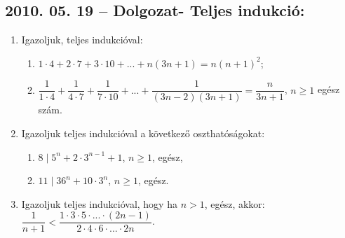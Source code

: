 \documentclass{article}
\newenvironment{abc}{\begin{enumerate}[label=\textit{\alph*})]}{\end{enumerate}}
\begin{document}
\subsection*{2010. 05. 19 -- Dolgozat- Teljes indukció:}
\begin{enumerate}
\item Igazoljuk, teljes indukcióval:
\begin{abc}
\item $1\cdot4+2\cdot7+3\cdot10+...+n(3n+1)=n(n+1)^{2}$;
\item $\dfrac{1}{1\cdot4}+\dfrac{1}{4\cdot7}+\dfrac{1}{7\cdot10}+...+\dfrac{1}{(3n-2)(3n+1)}=\dfrac{n}{3n+1}$,
$n\ge1$ egész szám.
\end{abc}
\item Igazoljuk teljes indukcióval a következő oszthatóságokat:
\begin{abc}
\item $8\mid 5^{n}+2\cdot3^{n-1}+1$, $n\ge1$, egész,
\item $11\mid 36^{n}+10\cdot 3^{n}$, $n\ge1$, egész.
\end{abc}
\item Igazoljuk teljes indukcióval, hogy ha $n>1$, egész, akkor:
$\dfrac{1}{n+1}<\dfrac{1\cdot3\cdot5\cdot...\cdot(2n-1)}{2\cdot4\cdot6\cdot...\cdot2n}$.
\end{enumerate}
\end{document}
